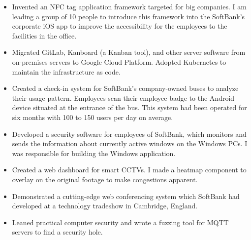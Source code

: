 \documentclass[10pt,a4paper,ragged2e,withhyper]{altacv}
\begin{document}
\begin{paracol}{2}

\begin{itemize}
\item 
  Invented an NFC tag application framework targeted for big companies.
  I am leading a group of 10 people to introduce this framework into the SoftBank's corporate iOS app to improve the accessibility for the employees to the facilities in the office.

\item
  Migrated GitLab, Kanboard (a Kanban tool), and other server software from on-premises servers to Google Cloud Platform.
  Adopted Kubernetes to maintain the infrastructure as code.

\item
  Created a check-in system for SoftBank's company-owned buses to analyze their usage pattern.
  Employees scan their employee badge to the Android device situated at the entrance of the bus.
  This system had been operated for six months with 100 to 150 users per day on average.

\item 
  Developed a security software for employees of SoftBank, which monitors and sends the information about currently active windows on the Windows PCs.
  I was responsible for building the Windows application.

\item
  Created a web dashboard for smart CCTVs.
  I made a heatmap component to overlay on the original footage to make congestions apparent. 

\item
  Demonstrated a cutting-edge web conferencing system which SoftBank had developed at a technology tradeshow in Cambridge, England.  

\end{itemize}

\divider


\begin{itemize}
  \item Leaned practical computer security and wrote a fuzzing tool for MQTT servers to find a security hole.
\end{itemize}


\end{paracol}
\end{document}
